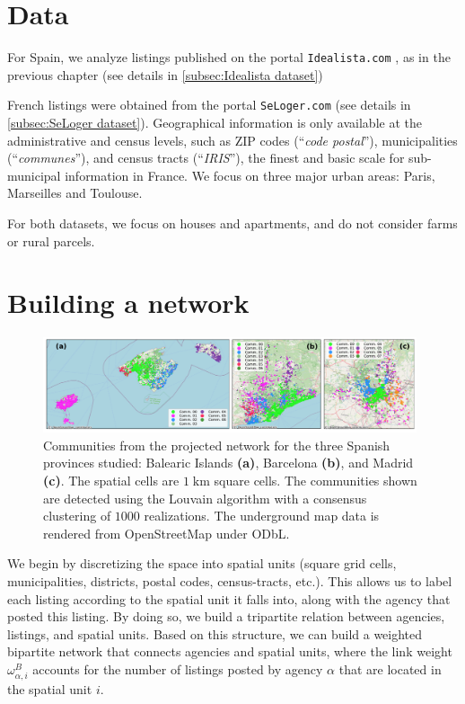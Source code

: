 \section{Data}

For Spain, we analyze listings published on the portal \texttt{Idealista.com} \cite{idealista}, as in the previous chapter (see details in \ref{subsec:Idealista dataset})

French listings were obtained from the portal \texttt{SeLoger.com} \cite{SeLoger} (see details in \ref{subsec:SeLoger dataset}). Geographical information is only available at the administrative and census levels, such as ZIP codes (``\textit{code postal}''), municipalities (``\textit{communes}''), and census tracts (``\textit{IRIS}''), the finest and basic scale for sub-municipal information in France. We focus on three major urban areas: Paris, Marseilles and Toulouse. 

For both datasets, we focus on houses and apartments, and do not consider farms or rural parcels.

\section{Building a network \label{sec:materials_and_methods}}

\begin{figure}[t]
    \centering
    \includegraphics[width = 0.98\textwidth]{Figs/Idealista_segmentation/Cell_communities.pdf}
    \caption[Market segmentation for $1 \; \textrm{km}$ square cells.]{ Communities from the projected network for the three Spanish provinces studied: Balearic Islands \textbf{(a)}, Barcelona \textbf{(b)}, and Madrid \textbf{(c)}. The spatial cells are $1 \; \textrm{km}$ square cells. The communities shown are detected using the Louvain algorithm with a consensus clustering of $1000$ realizations. The underground map data is rendered from OpenStreetMap under ODbL.\label{fig:cell_1000}}
\end{figure}

We begin by discretizing the space into spatial units (square grid cells, municipalities, districts, postal codes, census-tracts, etc.).
This allows us to label each listing according to the spatial unit it falls into, along with the agency that posted this listing. By doing so, we build a tripartite relation between agencies, listings, and spatial units. Based on this structure, we can build a weighted bipartite network that connects agencies and spatial units, where the link weight $\omega^{B}_{\alpha,i}$ accounts for the number of listings posted by agency $\alpha$ that are located in the spatial unit $i$.

